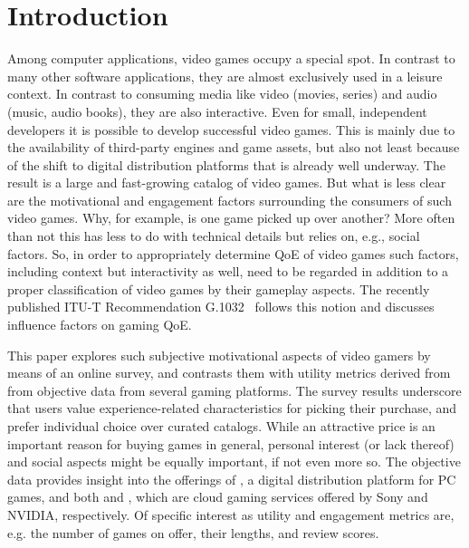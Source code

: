 
\section{Introduction}

Among computer applications, video games occupy a special spot.
In contrast to many other software applications, they are almost
exclusively used in a leisure context.
In contrast to consuming media like video (movies, series) and
audio (music, audio books), they are also interactive.
Even for small, independent developers it is possible to develop successful video games. This is mainly due to the availability of third-party engines and game assets, but also not least because of the shift to digital distribution platforms that is already well underway. The result is a large and fast-growing catalog of video games.
But what is less clear are the motivational and engagement factors surrounding the consumers of such video games. Why, for example, is one game picked up over another? More often than not this has less to do with technical details but relies on, e.g., social factors.
So, in order to appropriately determine \gls{QoE} of video games such factors, including context but interactivity as well, need to be regarded in addition to a proper classification of video games by their gameplay aspects.
The recently published \acrshort{ITU-T} Recommendation
G.1032~\cite{itutg1032} follows this notion and discusses influence
factors on gaming \gls{QoE}.

This paper explores such subjective motivational aspects of video gamers
by means of an online survey, and contrasts them with utility
metrics derived from from objective data from several gaming platforms.
The survey results underscore that users value experience-related
characteristics for picking their purchase, and prefer individual choice
over curated catalogs. While an attractive price is an important
reason for buying games in general, personal interest (or lack thereof) and social aspects might be equally important, if not even more so.
The objective data provides insight into the offerings of \steam, a digital distribution platform for PC games, and both \psnow and \gfnow, which are cloud gaming services offered by Sony and NVIDIA, respectively.
Of specific interest as utility and engagement metrics are, e.g. the number
of games on offer, their lengths, and review scores.
